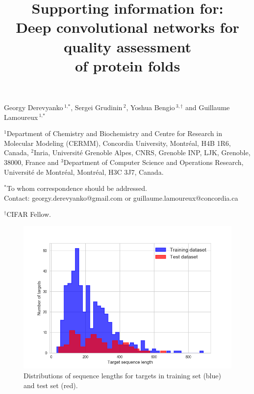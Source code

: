 \documentclass[letter,10pt]{article}
\title{Supporting information for:\\ Deep convolutional networks for quality assessment\\ of protein folds}
\date{}
\begin{document}
\maketitle

\noindent
Georgy Derevyanko\,$^{\text{1,}*}$, Sergei Grudinin\,$^{\text{2}}$, Yoshua Bengio\,$^{\text{3},\dagger}$ and Guillaume Lamoureux\,$^{\text{1,}*}$

\vspace{1em}
\noindent
$^{\text{1}}$Department of Chemistry and Biochemistry and Centre for Research in Molecular Modeling (CERMM), Concordia University, Montr{\'e}al, H4B 1R6, Canada,
$^{\text{2}}$Inria, Universit{\'e} Grenoble Alpes, CNRS, Grenoble INP, LJK, Grenoble, 38000, France and
$^{\text{3}}$Department of Computer Science and Operations Research, Universit{\'e} de Montr{\'e}al, Montr{\'e}al, H3C 3J7, Canada.

\vspace{1em}
\noindent
$^\ast$To whom correspondence should be addressed. \\
Contact: georgy.derevyanko@gmail.com or guillaume.lamoureux@concordia.ca

\vspace{1em}
\noindent
$^\dagger$CIFAR Fellow.

\newpage
\begin{figure}[H]
    \centering
    \includegraphics[width=\linewidth]{Fig/datasetLengthDistributions.png}
    \caption{Distributions of sequence lengths for targets in training set (blue) and test set (red).}
    \label{Fig:dataLengthDist}
\end{figure}
\end{document}
